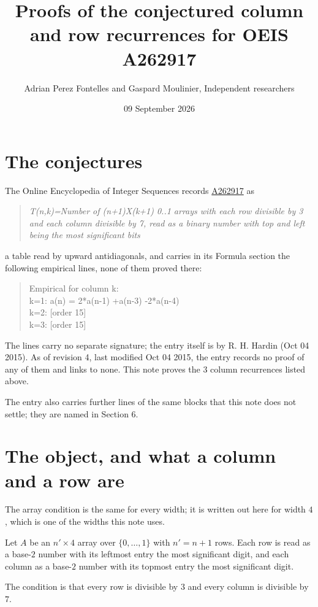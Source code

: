 \documentclass[11pt]{article}
\title{Proofs of the conjectured column and row recurrences for OEIS A262917}
\author{Adrian Perez Fontelles and Gaspard Moulinier, Independent researchers}
\date{09 September 2026}
\theoremstyle{definition}
\begin{document}
\maketitle
\section{The conjectures}

The Online Encyclopedia of Integer Sequences records \href{https://oeis.org/A262917}{A262917} as

\begin{quote}\itshape T(n,k)=Number of (n+1)X(k+1) 0..1 arrays with each row divisible by 3 and each column divisible by 7, read as a binary number with top and left being the most significant bits\end{quote}

a table read by upward antidiagonals, and carries in its Formula section the following empirical lines, none of them proved there:

\begin{quote}\ttfamily Empirical for column k:\\
k=1: a(n) = 2*a(n-1) +a(n-3) -2*a(n-4)\\k=2: [order 15]\\k=3: [order 15]\end{quote}

The lines carry no separate signature; the entry itself is by R. H. Hardin (Oct 04 2015). As of revision 4, last modified Oct 04 2015, the entry records no proof of any of them and links to none. This note proves the 3 column recurrences listed above.

The entry also carries further lines of the same blocks that this note does not settle; they are named in Section 6.

\section{The object, and what a column and a row are}

The array condition is the same for every width; it is written out here for width $4$, which is one of the widths this note uses.

Let $A$ be an $n' \times 4$ array over $\{0,\dots,1\}$ with $n' = n + 1$ rows. Each row is read as a base-$2$ number with its leftmost entry the most significant digit, and each column as a base-$2$ number with its topmost entry the most significant digit.

The condition is that every row is divisible by $3$ and every column is divisible by $7$.
\end{document}

